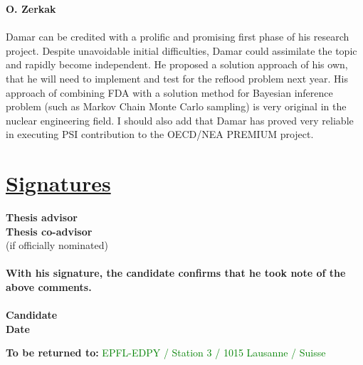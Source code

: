 \documentclass[11pt,titlepage]{article}
\begin{document}
\noindent\textbf{O. Zerkak}\\\\
\noindent Damar can be credited with a prolific and promising first phase of his research 
project. 
Despite unavoidable initial difficulties, Damar could assimilate the 
topic and rapidly become independent.
He proposed a solution approach of his own, that he will need to implement and 
test for the reflood problem next year.
His approach of combining FDA with a solution method for Bayesian inference 
problem (such as Markov Chain Monte Carlo sampling) is very original in 
the nuclear engineering field.
I should also add that Damar has proved very reliable in executing PSI 
contribution to the OECD/NEA PREMIUM project.

\section*{\underline{Signatures}\\}
\noindent \textbf{Thesis advisor}\hspace{6.25cm}\dotfill\vspace{0.5cm}\\

\noindent \textbf{Thesis co-advisor}\hspace{5.7cm}\dotfill\\
\noindent  (if officially nominated)\\\\

\noindent \textbf{With his signature, the candidate confirms that he took note 
                  of the above comments.}\\\\

\noindent \textbf{Candidate}\hspace{7cm}\dotfill\vspace{0.5cm}\\

\noindent \textbf{Date}\hspace{8.05cm}\dotfill\\

\vspace{0.8cm}
\begin{center}
\textbf{To be returned to:} \textcolor{green}{EPFL-EDPY / Station 3 
                                              / 1015 Lausanne / Suisse}
\end{center}
\end{document}
